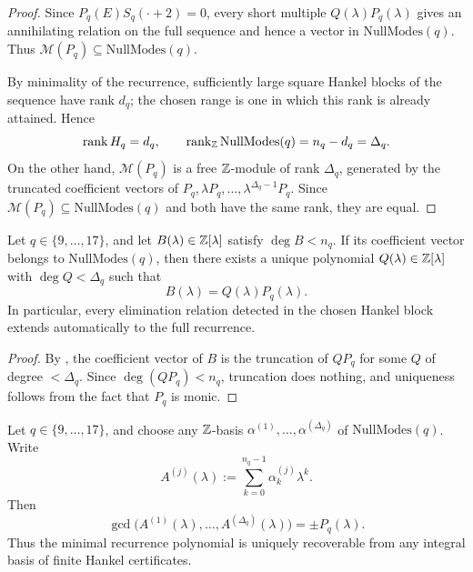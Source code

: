 \begin{proof}
Since \(P_q(E)S_q(\cdot+2)=0\), every short multiple \(Q(\lambda)P_q(\lambda)\)
gives an annihilating relation on the full sequence and hence a vector in
\(\mathrm{NullModes}(q)\).  Thus \(\mathcal M(P_q)\subseteq \mathrm{NullModes}(q)\).

By minimality of the recurrence, sufficiently large square Hankel blocks of the
sequence have rank \(d_q\); the chosen range is one in which this rank is
already attained.
Hence
\[
  \operatorname{rank} H_q=d_q,
  \qquad
  \operatorname{rank}_{\mathbb{Z}}\mathrm{NullModes}(q)=n_q-d_q=\Delta_q.
\]
On the other hand, \(\mathcal M(P_q)\) is a free \(\mathbb{Z}\)-module of rank
\(\Delta_q\), generated by the truncated coefficient vectors of
\(P_q,\lambda P_q,\dots,\lambda^{\Delta_q-1}P_q\).  Since
\(\mathcal M(P_q)\subseteq \mathrm{NullModes}(q)\) and both have the same rank,
they are equal.
\end{proof}

\begin{corollary}
\label{cor:no-spurious-elimination}
Let \(q\in\{9,\dots,17\}\), and let \(B(\lambda)\in\mathbb{Z}[\lambda]\) satisfy
\(\deg B<n_q\).  If its coefficient vector belongs to \(\mathrm{NullModes}(q)\),
then there exists a unique polynomial \(Q(\lambda)\in\mathbb{Z}[\lambda]\) with
\(\deg Q<\Delta_q\) such that
\[
  B(\lambda)=Q(\lambda)P_q(\lambda).
\]
In particular, every elimination relation detected in the chosen Hankel block
extends automatically to the full recurrence.
\end{corollary}

\begin{proof}
By , the coefficient vector of \(B\) is the
truncation of \(QP_q\) for some \(Q\) of degree \(<\Delta_q\).  Since
\(\deg(QP_q)<n_q\), truncation does nothing, and uniqueness follows from the
fact that \(P_q\) is monic.
\end{proof}

\begin{corollary}
\label{cor:gcd-recovers-minpoly}
Let \(q\in\{9,\dots,17\}\), and choose any \(\mathbb{Z}\)-basis
\(\alpha^{(1)},\dots,\alpha^{(\Delta_q)}\) of \(\mathrm{NullModes}(q)\).  Write
\[
  A^{(j)}(\lambda):=\sum_{k=0}^{n_q-1}\alpha^{(j)}_k\lambda^k.
\]
Then
\[
  \gcd\bigl(A^{(1)}(\lambda),\dots,A^{(\Delta_q)}(\lambda)\bigr)=\pm P_q(\lambda).
\]
Thus the minimal recurrence polynomial is uniquely recoverable from any integral
basis of finite Hankel certificates.
\end{corollary}

